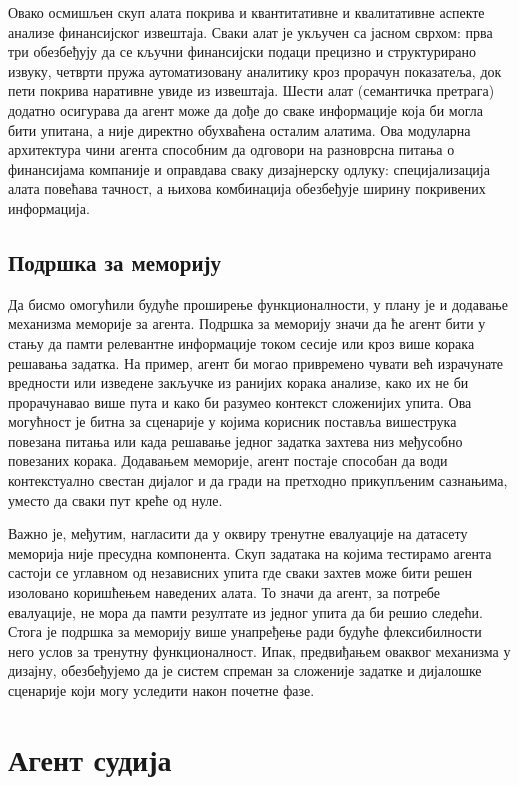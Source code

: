 Овако осмишљен скуп алата покрива и квантитативне и квалитативне аспекте анализе финансијског извештаја. Сваки алат је укључен са јасном сврхом: прва три обезбеђују да се кључни финансијски подаци прецизно и структурирано извуку, четврти пружа аутоматизовану аналитику кроз прорачун показатеља, док пети покрива наративне увиде из извештаја. Шести алат (семантичка претрага) додатно осигурава да агент може да дође до сваке информације која би могла бити упитана, а није директно обухваћена осталим алатима. Ова модуларна архитектура чини агента способним да одговори на разноврсна питања о финансијама компаније и оправдава сваку дизајнерску одлуку: специјализација алата повећава тачност, а њихова комбинација обезбеђује ширину покривених информација.

\subsection{Подршка за меморију}

Да бисмо омогућили будуће проширење функционалности, у плану је и додавање механизма меморије за агента. Подршка за меморију значи да ће агент бити у стању да памти релевантне информације током сесије или кроз више корака решавања задатка. На пример, агент би могао привремено чувати већ израчунате вредности или изведене закључке из ранијих корака анализе, како их не би прорачунавао више пута и како би разумео контекст сложенијих упита. Ова могућност је битна за сценарије у којима корисник поставља вишеструка повезана питања или када решавање једног задатка захтева низ међусобно повезаних корака. Додавањем меморије, агент постаје способан да води контекстуално свестан дијалог и да гради на претходно прикупљеним сазнањима, уместо да сваки пут креће од нуле.

Важно је, међутим, нагласити да у оквиру тренутне евалуације на датасету меморија није пресудна компонента. Скуп задатака на којима тестирамо агента састоји се углавном од независних упита где сваки захтев може бити решен изоловано коришћењем наведених алата. То значи да агент, за потребе евалуације, не мора да памти резултате из једног упита да би решио следећи. Стога је подршка за меморију више унапређење ради будуће флексибилности него услов за тренутну функционалност. Ипак, предвиђањем оваквог механизма у дизајну, обезбеђујемо да је систем спреман за сложеније задатке и дијалошке сценарије који могу уследити након почетне фазе.

\section{Агент судија}

